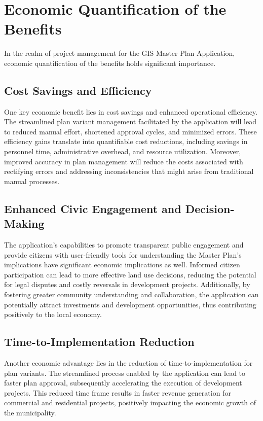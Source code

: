 \section{Economic Quantification of the Benefits}\label{sec:economic-quantification-of-the-benefits}
In the realm of project management for the GIS Master Plan Application, economic quantification of the benefits holds significant importance.

\subsection{Cost Savings and Efficiency}\label{subsec:cost-savings-and-efficiency}
One key economic benefit lies in cost savings and enhanced operational efficiency.
The streamlined plan variant management facilitated by the application will lead to reduced manual effort, shortened approval cycles, and minimized errors.
These efficiency gains translate into quantifiable cost reductions, including savings in personnel time, administrative overhead, and resource utilization.
Moreover, improved accuracy in plan management will reduce the costs associated with rectifying errors and addressing inconsistencies that might arise from traditional manual processes.

\subsection{Enhanced Civic Engagement and Decision-Making}\label{subsec:enhanced-civic-engagement-and-decision-making}
The application's capabilities to promote transparent public engagement and provide citizens with user-friendly tools for understanding the Master Plan's implications have significant economic implications as well.
Informed citizen participation can lead to more effective land use decisions, reducing the potential for legal disputes and costly reversals in development projects.
Additionally, by fostering greater community understanding and collaboration, the application can potentially attract investments and development opportunities, thus contributing positively to the local economy.

\subsection{Time-to-Implementation Reduction}\label{subsec:time-to-implementation-reduction}
Another economic advantage lies in the reduction of time-to-implementation for plan variants.
The streamlined process enabled by the application can lead to faster plan approval, subsequently accelerating the execution of development projects.
This reduced time frame results in faster revenue generation for commercial and residential projects, positively impacting the economic growth of the municipality.

